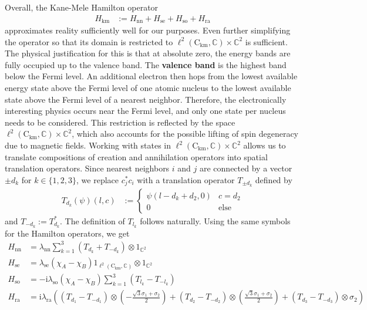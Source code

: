 Overall, the Kane-Mele Hamilton operator
\begin{align*}
  H_{\textrm{km}}
  &:=
  H_{\textrm{nn}}
  +
  H_{\textrm{se}}
  +
  H_{\textrm{so}}
  +
  H_{\textrm{ra}}
\end{align*}
approximates {\glqq}reality{\grqq} sufficiently well for our purposes.
Even further simplifying the operator so that its domain is restricted to $\ell^{2}(\mathrm{C}_{\textrm{km}},\mathbb{C}) \times \mathbb{C}^{2}$ is sufficient.
The physical justification for this is that at absolute zero, the energy bands are fully occupied up to the valence band.
The \textbf{valence band} is the highest band below the Fermi level.
An additional electron then {\glqq}hops{\grqq} from the lowest available energy state above the Fermi level of one atomic nucleus to the lowest available state above the Fermi level of a nearest neighbor.
Therefore, the electronically interesting physics occurs near the Fermi level, and only one state per nucleus needs to be considered.
This restriction is reflected by the space $\ell^{2}(\mathrm{C}_{\textrm{km}},\mathbb{C}) \times \mathbb{C}^{2}$, which also accounts for the possible lifting of spin degeneracy due to magnetic fields.
Working with states in $\ell^{2}(\mathrm{C}_{\textrm{km}},\mathbb{C}) \times \mathbb{C}^{2}$ allows us to translate compositions of creation and annihilation operators into spatial translation operators.
Since nearest neighbors $i$ and $j$ are connected by a vector $\pm d_{k}$ for $k \in \{1,2,3\}$, we replace $c_{j}^{\ast}c_{i}$ with a translation operator $T_{\pm d_{k}}$ defined by
\begin{align*}
  T_{d_{k}}(\psi)(l,c)
  &:=
  \begin{cases}
    \psi(l - d_{k} + d_{2},0)
    &
    c
    =
    d_{2}
    \\
    0
    &
    \text{else}
  \end{cases}
\end{align*}
and $T_{-d_{k}} := T_{d_{k}}^{\ast}$.
The definition of $T_{l_{k}}$ follows naturally.
Using the same symbols for the Hamilton operators, we get
\begin{align*}
  H_{\textrm{nn}}
  &=
  \lambda_{\textrm{nn}}
  \sum_{k=1}^{3}
  \left(
    T_{d_{k}}
    +
    T_{-d_{k}}
  \right)
  \otimes
  1_{\mathbb{C}^{2}}
  \\
  H_{\textrm{se}}
  &=
  \lambda_{\textrm{se}}
  (\chi_{A} - \chi_{B})
  1_{\ell^{2}(\mathrm{C}_{\textrm{km}},\mathbb{C})}
  \otimes
  1_{\mathbb{C}^{2}}
  \\
  H_{\textrm{so}}
  &=
  -
  \mathrm{i}
  \lambda_{\textrm{so}}
  (\chi_{A} - \chi_{B})
  \sum_{k=1}^{3}
  \left(
    T_{l_{k}}
    -
    T_{-l_{k}}
  \right)
  \\
  H_{\textrm{ra}}
  &=
  \mathrm{i}
  \lambda_{\textrm{ra}}
  \left(
    \left(
      T_{d_{1}}
      -
      T_{-d_{1}}
    \right)
    \otimes
    \left(
      -
      \frac{\sqrt{3}\sigma_{1} + \sigma_{2}}{2}
    \right)
    +
    \left(
      T_{d_{2}}
      -
      T_{-d_{2}}
    \right)
    \otimes
    \left(
      \frac{\sqrt{3}\sigma_{1} + \sigma_{2}}{2}
    \right)
    +
    \left(
      T_{d_{3}}
      -
      T_{-d_{3}}
    \right)
    \otimes
    \sigma_{2}
  \right)
\end{align*}

